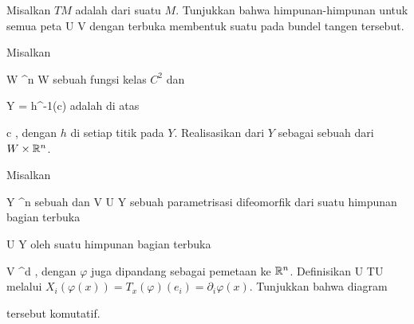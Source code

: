 {}
{

Misalkan $TM$ adalah
dari suatu
$M$. Tunjukkan bahwa himpunan-himpunan
 untuk semua peta
\maabbdisp {\alpha} { U } { V
} {}
dengan
 terbuka membentuk suatu
pada bundel tangen tersebut.

}
{} {}

{}
{

Misalkan

\mavergleichskette
{\vergleichskette
{ W
}
{ \subseteq }{ \R^n
}
{  }{
}
{    }{
}
{   }{
}
}
{}{}{}
 { W } { \R
} {}
sebuah
fungsi kelas $C^2$
dan

\mavergleichskette
{\vergleichskette
{ Y
}
{ = }{ h^{-1}(c)
}
{  }{
}
{    }{
}
{   }{
}
}
{}{}{}
adalah
di atas

\mavergleichskette
{\vergleichskette
{ c
}
{ \in }{ \R
}
{  }{
}
{    }{
}
{   }{
}
}
{}{}{,}
dengan $h$
di setiap titik pada $Y$. Realisasikan
dari $Y$ sebagai sebuah
dari $W \times {\mathbb R}^n$.

}
{} {}

{}
{

Misalkan

\mavergleichskette
{\vergleichskette
{ Y
}
{ \subseteq }{ \R^n
}
{  }{
}
{    }{
}
{   }{
}
}
{}{}{}
sebuah
dan
\maabb {\varphi} { V } { U \subseteq Y
} {}
sebuah parametrisasi difeomorfik dari suatu himpunan bagian terbuka

\mavergleichskette
{\vergleichskette
{ U
}
{ \subseteq }{ Y
}
{  }{
}
{    }{
}
{   }{
}
}
{}{}{}
oleh suatu himpunan bagian terbuka

\mavergleichskette
{\vergleichskette
{ V
}
{ \subseteq }{ \R^d
}
{  }{
}
{    }{
}
{   }{
}
}
{}{}{,}
dengan $\varphi$ juga dipandang sebagai pemetaan ke ${\mathbb R}^n$. Definisikan
 {U} {TU
} {}
melalui $X_i(\varphi(x))=T_x(\varphi)(e_i)=\partial_i\varphi(x)$. Tunjukkan bahwa diagram

 {  }

tersebut komutatif.

}
{} {}

